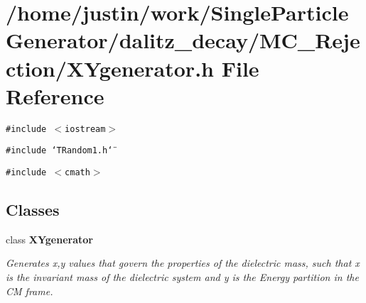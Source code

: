 \section{/home/justin/work/Single\-Particle\-Generator/dalitz\_\-decay/MC\_\-Rejection/XYgenerator.h File Reference}
\label{XYgenerator_8h}
{\tt \#include $<$iostream$>$}\par
{\tt \#include \char`\"{}TRandom1.h\char`\"{}}\par
{\tt \#include $<$cmath$>$}\par
\subsection*{Classes}
\begin{CompactItemize}
\item 
class \bf{XYgenerator}
\begin{CompactList}\small\item\em Generates x,y values that govern the properties of the dielectric mass, such that x is the invariant mass of the dielectric system and y is the Energy partition in the CM frame. \item\end{CompactList}\end{CompactItemize}
